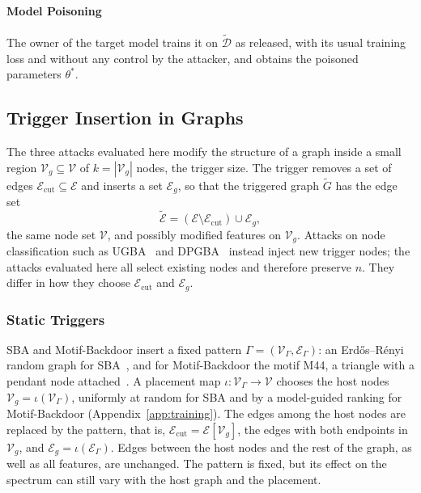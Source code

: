 \documentclass[journal]{IEEEtran}
\newcommand{\calV}{\mathcal{V}}         %
\newcommand{\calE}{\mathcal{E}}         %
\newcommand{\calD}{\mathcal{D}}         %
\begin{document}
\paragraph{Model Poisoning}
The owner of the target model trains it on $\widetilde{\calD}$ as released,
with its usual training loss and without any control by the attacker, and
obtains the poisoned parameters $\theta^*$.

\subsection{Trigger Insertion in Graphs}\label{sec:insertion}
The three attacks evaluated here modify the structure of a graph inside a small
region $\calV_g\subseteq\calV$ of $k=|\calV_g|$ nodes, the trigger size. The
trigger removes a set of edges $\calE_{\mathrm{cut}}\subseteq\calE$ and inserts
a set $\calE_g$, so that the triggered graph $\tilde G$ has the edge set
\begin{equation}
\tilde{\calE}=(\calE\setminus\calE_{\mathrm{cut}})\cup\calE_g,
\label{eq:edge-composition}
\end{equation}
the same node set $\calV$, and possibly modified features on $\calV_g$. Attacks
on node classification such as UGBA~\cite{ugba2022} and
DPGBA~\cite{dpgba2023} instead inject new trigger nodes; the attacks evaluated
here all select existing nodes and therefore preserve $n$. They differ in how
they choose $\calE_{\mathrm{cut}}$ and $\calE_g$.

\subsubsection{Static Triggers}\label{sec:static}
SBA and Motif-Backdoor insert a fixed pattern $\Gamma=(\calV_\Gamma,\calE_\Gamma)$:
an Erd\H{o}s--R\'enyi random graph for SBA~\cite{sba2021}, and for
Motif-Backdoor the motif M44, a triangle with a pendant node
attached~\cite{motif}. A placement map $\iota\colon\calV_\Gamma\to\calV$ chooses
the host nodes $\calV_g=\iota(\calV_\Gamma)$, uniformly at random for SBA and by
a model-guided ranking for Motif-Backdoor (Appendix~\ref{app:training}). The
edges among the host nodes are replaced by the pattern, that is,
$\calE_{\mathrm{cut}}=\calE[\calV_g]$, the edges with both endpoints in
$\calV_g$, and $\calE_g=\iota(\calE_\Gamma)$. Edges between the host nodes and
the rest of the graph, as well as all features, are unchanged. The pattern is
fixed, but its effect on the spectrum can still vary with the host graph and
the placement.
\end{document}
